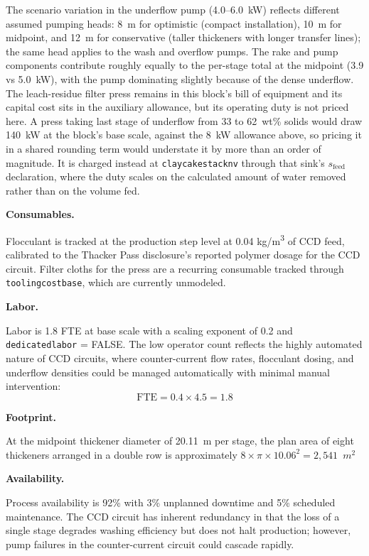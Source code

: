 \documentclass{article}
\renewcommand\_{\textunderscore\allowbreak}
\begin{document}
\noindent The scenario variation in the underflow pump (4.0--6.0~kW) reflects different assumed pumping heads: 8~m for optimistic (compact installation), 10~m for midpoint, and 12~m for conservative (taller thickeners with longer transfer lines); the same head applies to the wash and overflow pumps. The rake and pump components contribute roughly equally to the per-stage total at the midpoint (3.9 vs 5.0~kW), with the pump dominating slightly because of the dense underflow. The leach-residue filter press remains in this block's bill of equipment and its capital cost sits in the auxiliary allowance, but its operating duty is not priced here. A press taking last stage of underflow from 33 to 62~wt\% solids would draw 140~kW at the block's base scale, against the 8~kW allowance above, so pricing it in a shared rounding term would understate it by more than an order of magnitude. It is charged instead at \texttt{claycake\_stack\_nv\_62} through that sink's $s_{\text{feed}}$ declaration, where the duty scales on the calculated amount of water removed rather than on the volume fed.

\medskip
\noindent\textbf{Consumables.}\quad

Flocculant is tracked at the production step level at 0.04 \si{kg/m^3} of CCD feed, calibrated to the Thacker Pass disclosure's reported polymer dosage for the CCD circuit. Filter cloths for the press are a recurring consumable tracked through \texttt{tooling\_cost\_base}, which are currently unmodeled.

\medskip
\noindent\textbf{Labor.}\quad

Labor is 1.8 FTE at base scale with a scaling exponent of 0.2 and \texttt{dedicated\_labor} = FALSE. The low operator count reflects the highly automated nature of CCD circuits, where counter-current flow rates, flocculant dosing, and underflow densities could be managed automatically with minimal manual intervention:
\[
	\text{FTE} = 0.4 \times 4.5 = 1.8
\]

\medskip
\noindent\textbf{Footprint.}\quad

At the midpoint thickener diameter of 20.11~m per stage, the plan area of eight thickeners arranged in a double row is approximately $8 \times \pi \times 10.06^2 = 2,541$~$\si{m^2}$

\medskip
\noindent\textbf{Availability.}\quad

Process availability is 92\% with 3\% unplanned downtime and 5\% scheduled maintenance. The CCD circuit has inherent redundancy in that the loss of a single stage degrades washing efficiency but does not halt production; however, pump failures in the counter-current circuit could cascade rapidly.
\end{document}
